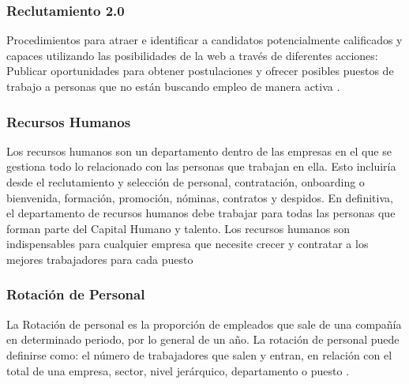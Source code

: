 \subsubsection*{Reclutamiento 2.0}

Procedimientos para atraer e identificar a candidatos potencialmente calificados y capaces utilizando las posibilidades de la web a través de diferentes acciones: Publicar oportunidades para obtener postulaciones y ofrecer posibles puestos de trabajo a personas que no están buscando empleo de manera activa \cite{reclutamiento2}.

\subsubsection*{Recursos Humanos}

Los recursos humanos son un departamento dentro de las empresas en el que se gestiona todo lo relacionado con las personas que trabajan en ella. Esto incluiría desde el reclutamiento y selección de personal, contratación, onboarding o bienvenida, formación, promoción, nóminas, contratos y despidos. En definitiva, el departamento de recursos humanos debe trabajar para todas las personas que forman parte del Capital Humano y talento. Los recursos humanos son indispensables para cualquier empresa que necesite crecer y contratar a los mejores trabajadores para cada puesto \cite{recursos}

\subsubsection*{Rotación de Personal}

La Rotación de personal es la proporción de empleados que sale de una compañía en determinado periodo, por lo general de un año. La rotación de personal puede definirse como: el número de trabajadores que salen y entran, en relación con el total de una empresa, sector, nivel jerárquico, departamento o puesto \cite{rotacion}.